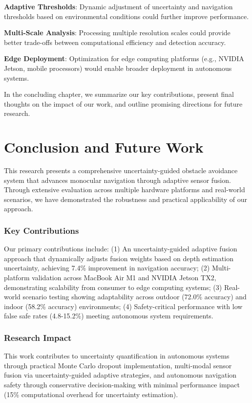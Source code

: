 \documentclass[12pt,oneside]{book}
\begin{document}
\textbf{Adaptive Thresholds}: Dynamic adjustment of uncertainty and navigation thresholds based on environmental conditions could further improve performance.

\textbf{Multi-Scale Analysis}: Processing multiple resolution scales could provide better trade-offs between computational efficiency and detection accuracy.

\textbf{Edge Deployment}: Optimization for edge computing platforms (e.g., NVIDIA Jetson, mobile processors) would enable broader deployment in autonomous systems.

\vspace{12pt}
In the concluding chapter, we summarize our key contributions, present final thoughts on the impact of our work, and outline promising directions for future research.

\chapter{Conclusion and Future Work}

This research presents a comprehensive uncertainty-guided obstacle avoidance system that advances monocular navigation through adaptive sensor fusion. Through extensive evaluation across multiple hardware platforms and real-world scenarios, we have demonstrated the robustness and practical applicability of our approach.

\subsection{Key Contributions}

Our primary contributions include: (1) An uncertainty-guided adaptive fusion approach that dynamically adjusts fusion weights based on depth estimation uncertainty, achieving 7.4\% improvement in navigation accuracy; (2) Multi-platform validation across MacBook Air M1 and NVIDIA Jetson TX2, demonstrating scalability from consumer to edge computing systems; (3) Real-world scenario testing showing adaptability across outdoor (72.0\% accuracy) and indoor (58.2\% accuracy) environments; (4) Safety-critical performance with low false safe rates (4.8-15.2\%) meeting autonomous system requirements.

\subsection{Research Impact}

This work contributes to uncertainty quantification in autonomous systems through practical Monte Carlo dropout implementation, multi-modal sensor fusion via uncertainty-guided adaptive strategies, and autonomous navigation safety through conservative decision-making with minimal performance impact (15\% computational overhead for uncertainty estimation).
\end{document}
